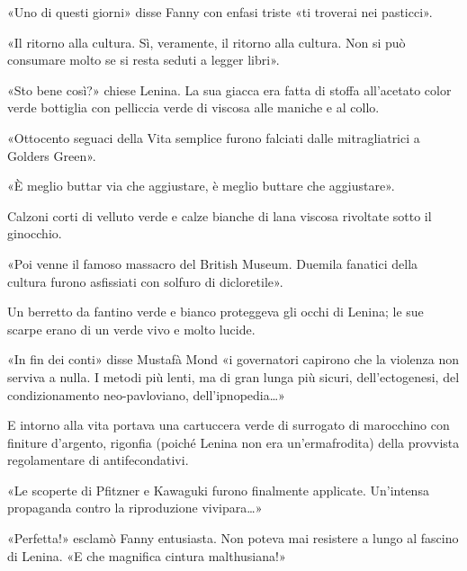 \documentclass[
a5paper, %
10pt, %
twoside, 
onecolumn, %
openany, %
]{memoir}
\renewenvironment{shaded}{%
  \def\FrameCommand{\fboxsep=\FrameSep \colorbox{shadecolor}}%
  \MakeFramed{\advance\hsize-\width \FrameRestore\FrameRestore}}%
 {\endMakeFramed}
\begin{document}
\begin{shaded}
    «Uno di questi giorni» disse Fanny con enfasi triste «ti troverai nei pasticci».
\end{shaded}

«Il ritorno alla cultura. Sì, veramente, il ritorno alla cultura. Non si può consumare molto se si resta seduti a legger libri».

\begin{shaded}
    «Sto bene così?» chiese Lenina. La sua giacca era fatta di stoffa all’acetato color verde bottiglia con pelliccia verde di viscosa alle maniche e al collo.
\end{shaded}

«Ottocento seguaci della Vita semplice furono falciati dalle mitragliatrici a Golders Green».

«È meglio buttar via che aggiustare, è meglio buttare che aggiustare».

\begin{shaded}
    Calzoni corti di velluto verde e calze bianche di lana viscosa rivoltate sotto il ginocchio.
\end{shaded}

«Poi venne il famoso massacro del British Museum. Duemila fanatici della cultura furono asfissiati con solfuro di dicloretile».

\begin{shaded}
    Un berretto da fantino verde e bianco proteggeva gli occhi di Lenina; le sue scarpe erano di un verde vivo e molto lucide.
\end{shaded}

«In fin dei conti» disse Mustafà Mond «i governatori capirono che la violenza non serviva a nulla. I metodi più lenti, ma di gran lunga più sicuri, dell’ectogenesi, del condizionamento neo-pavloviano, dell’ipnopedia…»

\begin{shaded}
    E intorno alla vita portava una cartuccera verde di surrogato di marocchino con finiture d’argento, rigonfia (poiché Lenina non era un’ermafrodita) della provvista regolamentare di antifecondativi.
\end{shaded}

«Le scoperte di Pfitzner e Kawaguki furono finalmente applicate. Un’intensa propaganda contro la riproduzione vivipara…»

\begin{shaded}
    «Perfetta!» esclamò Fanny entusiasta. Non poteva mai resistere a lungo al fascino di Lenina. «E che magnifica cintura malthusiana!»
\end{shaded}
\end{document}
